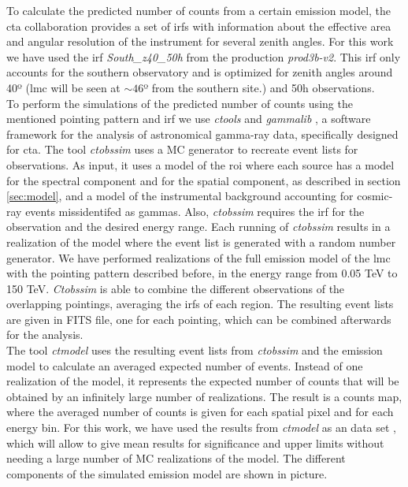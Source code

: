 \documentclass[main.tex]{subfiles}
\begin{document}
    To calculate the predicted number of counts from a certain emission model, the \gls{cta} collaboration provides a set of \glspl{irf} \cite{CTAPerformance} with information about the effective area and angular resolution of the instrument for several zenith angles. For this work we have used the \gls{irf} \textit{South\_z40\_50h} from the production \textit{prod3b-v2}. This \gls{irf} only accounts for the southern observatory and is optimized for zenith angles around 40º (\gls{lmc} will be seen at $\sim 46$º from the southern site.) and 50h observations. \\
    To perform the simulations of the predicted number of counts using the mentioned pointing pattern and \gls{irf} we use \textit{ctools} and \textit{gammalib} \cite{2016Actools}, a software framework for the analysis of astronomical gamma-ray data, specifically designed for \gls{cta}. The tool \textit{ctobssim} uses a MC generator to recreate event lists for observations. As input, it uses a model of the \gls{roi} where each source has a model for the spectral component and for the spatial component, as described in section \ref{sec:model}, and a model of the instrumental background accounting for cosmic-ray events missidentifed as gammas.
    Also, \textit{ctobssim} requires the \gls{irf} for the observation and the desired energy range. Each running of \textit{ctobssim} results in a realization of the model where the event list is generated with a random number generator. We have performed realizations of the full emission model of the \gls{lmc} with the pointing pattern described before, in the energy range from 0.05 TeV to 150 TeV. \textit{Ctobssim} is able to combine the different observations of the overlapping pointings, averaging the \glspl{irf} of each region. The resulting event lists are given in FITS file, one for each pointing, which can be combined afterwards for the analysis.\\
    The tool \textit{ctmodel} uses the resulting event lists from \textit{ctobssim} and the emission model to calculate an averaged expected number of events. Instead of one realization of the model, it represents the expected number of counts that will be obtained by an infinitely large number of realizations. The result is a counts map, where the averaged number of counts is given for each spatial pixel and for each energy bin. For this work, we have used the results from \textit{ctmodel} as an  data set \cite{2011Asimov}, which will allow to give mean results for significance and upper limits without needing a large number of MC realizations of the model.
    The different components of the simulated emission model are shown in picture.
\end{document}
